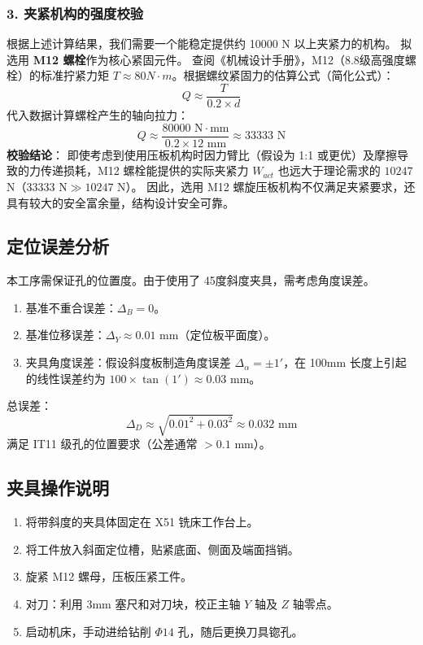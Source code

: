 \documentclass[withoutpreface,bwprint]{cumcmthesis}
\begin{document}
\subsubsection{3. 夹紧机构的强度校验}
根据上述计算结果，我们需要一个能稳定提供约 10000 N 以上夹紧力的机构。
拟选用 \textbf{M12 螺栓}作为核心紧固元件。
查阅《机械设计手册》，M12（8.8级高强度螺栓）的标准拧紧力矩 $T \approx 80 N\cdot m$。根据螺纹紧固力的估算公式（简化公式）：
\[ Q \approx \frac{T}{0.2 \times d} \]
代入数据计算螺栓产生的轴向拉力：
\[ Q \approx \frac{80000 \text{ N}\cdot\text{mm}}{0.2 \times 12 \text{ mm}} \approx 33333 \text{ N} \]
\textbf{校验结论}：
即使考虑到使用压板机构时因力臂比（假设为 1:1 或更优）及摩擦导致的力传递损耗，M12 螺栓能提供的实际夹紧力 $W_{act}$ 也远大于理论需求的 $10247$ N（$33333 \text{ N} \gg 10247 \text{ N}$）。
因此，选用 M12 螺旋压板机构不仅满足夹紧要求，还具有较大的安全富余量，结构设计安全可靠。

\subsection{定位误差分析}
本工序需保证孔的位置度。由于使用了 45度斜度夹具，需考虑角度误差。
\begin{enumerate}
    \item 基准不重合误差：$\Delta_B = 0$。
    \item 基准位移误差：$\Delta_Y \approx 0.01$ mm（定位板平面度）。
    \item 夹具角度误差：假设斜度板制造角度误差 $\Delta_\alpha = \pm 1'$，在 100mm 长度上引起的线性误差约为 $100 \times \tan(1') \approx 0.03$ mm。
\end{enumerate}
总误差：
\[ \Delta_D \approx \sqrt{0.01^2 + 0.03^2} \approx 0.032 \text{ mm} \]
满足 IT11 级孔的位置要求（公差通常 $>0.1$ mm）。

\subsection{夹具操作说明}
\begin{enumerate}
    \item 将带斜度的夹具体固定在 X51 铣床工作台上。
    \item 将工件放入斜面定位槽，贴紧底面、侧面及端面挡销。
    \item 旋紧 M12 螺母，压板压紧工件。
    \item 对刀：利用 3mm 塞尺和对刀块，校正主轴 $Y$ 轴及 $Z$ 轴零点。
    \item 启动机床，手动进给钻削 $\Phi14$ 孔，随后更换刀具锪孔。
\end{enumerate}
\end{document}
